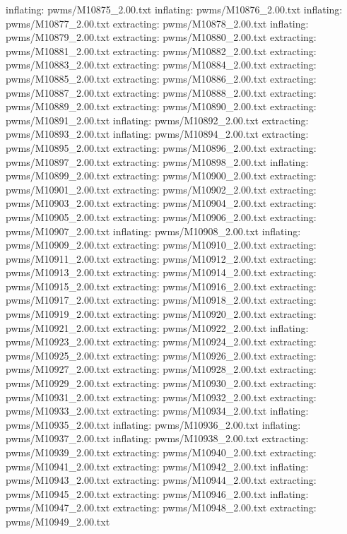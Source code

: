 \documentclass[letterpaper,10pt,english]{sphinxmanual}
\begin{document}
{\begin{sphinxVerbatim}[commandchars=\\\{\}]
  inflating: pwms/M10875\_2.00.txt
  inflating: pwms/M10876\_2.00.txt
  inflating: pwms/M10877\_2.00.txt
 extracting: pwms/M10878\_2.00.txt
  inflating: pwms/M10879\_2.00.txt
 extracting: pwms/M10880\_2.00.txt
 extracting: pwms/M10881\_2.00.txt
 extracting: pwms/M10882\_2.00.txt
 extracting: pwms/M10883\_2.00.txt
 extracting: pwms/M10884\_2.00.txt
 extracting: pwms/M10885\_2.00.txt
 extracting: pwms/M10886\_2.00.txt
 extracting: pwms/M10887\_2.00.txt
 extracting: pwms/M10888\_2.00.txt
 extracting: pwms/M10889\_2.00.txt
 extracting: pwms/M10890\_2.00.txt
 extracting: pwms/M10891\_2.00.txt
  inflating: pwms/M10892\_2.00.txt
 extracting: pwms/M10893\_2.00.txt
  inflating: pwms/M10894\_2.00.txt
 extracting: pwms/M10895\_2.00.txt
 extracting: pwms/M10896\_2.00.txt
 extracting: pwms/M10897\_2.00.txt
 extracting: pwms/M10898\_2.00.txt
  inflating: pwms/M10899\_2.00.txt
 extracting: pwms/M10900\_2.00.txt
 extracting: pwms/M10901\_2.00.txt
 extracting: pwms/M10902\_2.00.txt
 extracting: pwms/M10903\_2.00.txt
 extracting: pwms/M10904\_2.00.txt
 extracting: pwms/M10905\_2.00.txt
 extracting: pwms/M10906\_2.00.txt
 extracting: pwms/M10907\_2.00.txt
  inflating: pwms/M10908\_2.00.txt
  inflating: pwms/M10909\_2.00.txt
 extracting: pwms/M10910\_2.00.txt
 extracting: pwms/M10911\_2.00.txt
 extracting: pwms/M10912\_2.00.txt
 extracting: pwms/M10913\_2.00.txt
 extracting: pwms/M10914\_2.00.txt
 extracting: pwms/M10915\_2.00.txt
 extracting: pwms/M10916\_2.00.txt
 extracting: pwms/M10917\_2.00.txt
 extracting: pwms/M10918\_2.00.txt
 extracting: pwms/M10919\_2.00.txt
 extracting: pwms/M10920\_2.00.txt
 extracting: pwms/M10921\_2.00.txt
 extracting: pwms/M10922\_2.00.txt
  inflating: pwms/M10923\_2.00.txt
 extracting: pwms/M10924\_2.00.txt
 extracting: pwms/M10925\_2.00.txt
 extracting: pwms/M10926\_2.00.txt
 extracting: pwms/M10927\_2.00.txt
 extracting: pwms/M10928\_2.00.txt
 extracting: pwms/M10929\_2.00.txt
 extracting: pwms/M10930\_2.00.txt
 extracting: pwms/M10931\_2.00.txt
 extracting: pwms/M10932\_2.00.txt
 extracting: pwms/M10933\_2.00.txt
 extracting: pwms/M10934\_2.00.txt
  inflating: pwms/M10935\_2.00.txt
  inflating: pwms/M10936\_2.00.txt
  inflating: pwms/M10937\_2.00.txt
  inflating: pwms/M10938\_2.00.txt
 extracting: pwms/M10939\_2.00.txt
 extracting: pwms/M10940\_2.00.txt
 extracting: pwms/M10941\_2.00.txt
 extracting: pwms/M10942\_2.00.txt
  inflating: pwms/M10943\_2.00.txt
 extracting: pwms/M10944\_2.00.txt
 extracting: pwms/M10945\_2.00.txt
 extracting: pwms/M10946\_2.00.txt
  inflating: pwms/M10947\_2.00.txt
 extracting: pwms/M10948\_2.00.txt
 extracting: pwms/M10949\_2.00.txt

\end{sphinxVerbatim}}
\end{document}
